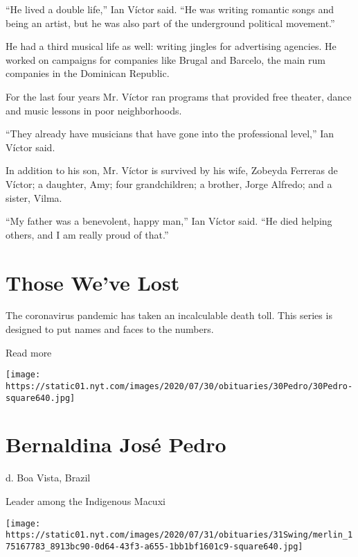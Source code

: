``He lived a double life,'' Ian Víctor said. ``He was writing romantic
songs and being an artist, but he was also part of the underground
political movement.''

He had a third musical life as well: writing jingles for advertising
agencies. He worked on campaigns for companies like Brugal and Barcelo,
the main rum companies in the Dominican Republic.

For the last four years Mr. Víctor ran programs that provided free
theater, dance and music lessons in poor neighborhoods.

``They already have musicians that have gone into the professional
level,'' Ian Víctor said.

In addition to his son, Mr. Víctor is survived by his wife, Zobeyda
Ferreras de Víctor; a daughter, Amy; four grandchildren; a brother,
Jorge Alfredo; and a sister, Vilma.

``My father was a benevolent, happy man,'' Ian Víctor said. ``He died
helping others, and I am really proud of that.''

\href{https://www.nytimes.com/interactive/2020/obituaries/people-died-coronavirus-obituaries.html?action=click\&pgtype=Article\&state=default\&region=BELOW_MAIN_CONTENT\&context=covid_obits_promo}{}

\hypertarget{those-weve-lost}{%
\section{Those We've Lost}\label{those-weve-lost}}

The coronavirus pandemic has taken an incalculable death toll. This
series is designed to put names and faces to the numbers.

Read more

\texttt{[image: https://static01.nyt.com/images/2020/07/30/obituaries/30Pedro/30Pedro-square640.jpg]}

\hypertarget{bernaldina-josuxe9-pedro}{%
\section{Bernaldina José Pedro}\label{bernaldina-josuxe9-pedro}}

d. Boa Vista, Brazil

Leader among the Indigenous Macuxi

\texttt{[image: https://static01.nyt.com/images/2020/07/31/obituaries/31Swing/merlin\_175167783\_8913bc90-0d64-43f3-a655-1bb1bf1601c9-square640.jpg]}

